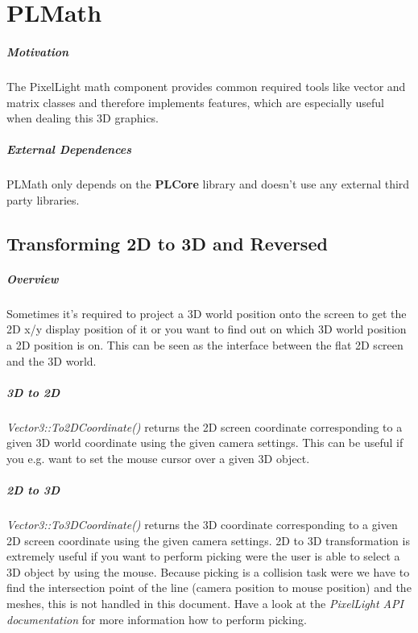 \chapter{PLMath}


\paragraph{Motivation}
The PixelLight math component provides common required tools like vector and matrix classes and therefore implements features, which are especially useful when dealing this 3D graphics.


\paragraph{External Dependences}
PLMath only depends on the \textbf{PLCore} library and doesn't use any external third party libraries.




\section{Transforming 2D to 3D and Reversed}


\paragraph{Overview}
Sometimes it's required to project a 3D world position onto the screen to get the 2D x/y display position of it or you want to find out on which 3D world position a 2D position is on. This can be seen as the interface between the flat 2D screen and the 3D world.


\paragraph{3D to 2D}
\emph{Vector3::To2DCoordinate()} returns the 2D screen coordinate corresponding to a given 3D world coordinate using the given camera settings. This can be useful if you e.g. want to set the mouse cursor over a given 3D object.


\paragraph{2D to 3D}
\emph{Vector3::To3DCoordinate()} returns the 3D coordinate corresponding to a given 2D screen coordinate using the given camera settings. 2D to 3D transformation is extremely useful if you want to perform picking were the user is able to select a 3D object by using the mouse. Because picking is a collision task were we have to find the intersection point of the line (camera position to mouse position) and the meshes, this is not handled in this document. Have a look at the \emph{PixelLight \ac{API} documentation} for more information how to perform picking.





